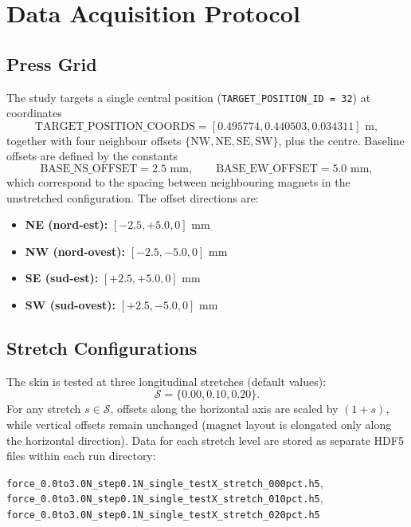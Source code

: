 \documentclass[11pt,a4paper]{article}
\begin{document}
\section{Data Acquisition Protocol}

\subsection{Press Grid}
The study targets a single central position (\texttt{TARGET\_POSITION\_ID = 32}) at coordinates
\[
    \text{TARGET\_POSITION\_COORDS} = [0.495774, 0.440503, 0.034311] \text{ m},
\]
together with four neighbour offsets \(\{\text{NW}, \text{NE}, \text{SE}, \text{SW}\}\), plus the centre. Baseline offsets
are defined by the constants
\[
    \text{BASE\_NS\_OFFSET} = 2.5 \text{ mm}, \qquad
    \text{BASE\_EW\_OFFSET} = 5.0 \text{ mm},
\]
which correspond to the spacing between neighbouring magnets in the unstretched configuration. The offset directions are:
\begin{itemize}[leftmargin=1.5em]
    \item \textbf{NE (nord-est):} \([-2.5, +5.0, 0]\) mm
    \item \textbf{NW (nord-ovest):} \([-2.5, -5.0, 0]\) mm
    \item \textbf{SE (sud-est):} \([+2.5, +5.0, 0]\) mm
    \item \textbf{SW (sud-ovest):} \([+2.5, -5.0, 0]\) mm
\end{itemize}

\subsection{Stretch Configurations}
The skin is tested at three longitudinal stretches (default values):
\[
    \mathcal{S} = \{0.00, 0.10, 0.20\}.
\]
For any stretch \(s \in \mathcal{S}\), offsets along the horizontal axis are scaled by
\((1+s)\), while vertical offsets remain unchanged (magnet layout is elongated only along the
horizontal direction). Data for each stretch level are stored as separate HDF5 files within each run directory:
\begin{center}
\texttt{force\_0.0to3.0N\_step0.1N\_single\_testX\_stretch\_000pct.h5}, \texttt{force\_0.0to3.0N\_step0.1N\_single\_testX\_stretch\_010pct.h5}, \texttt{force\_0.0to3.0N\_step0.1N\_single\_testX\_stretch\_020pct.h5}
\end{center}
\end{document}
